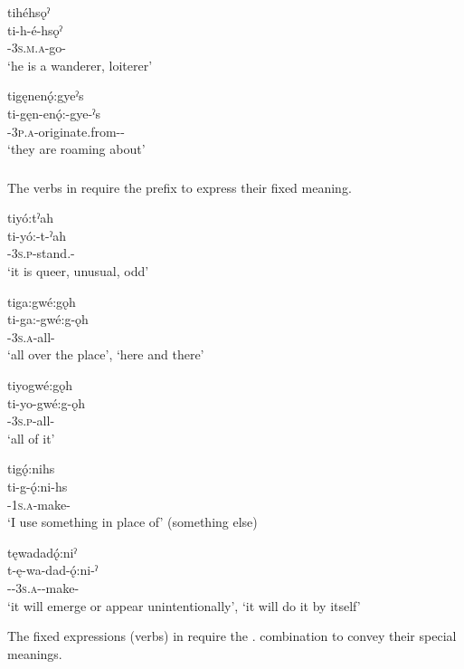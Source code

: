 \ex tihéhsǫˀ\\
\gll ti-h-é-hsǫˀ\\
{\contrastive}-\textsc{3s.m.a}-go-{\pluralizer}\\
\glt `he is a wanderer, loiterer'

\ex tigęnenǫ́:gyeˀs\\
\gll ti-gęn-enǫ́:-gye-ˀs\\
{\contrastive}-\textsc{3p.a}-originate.from-\exsc{\progressive}-{\habitual}\\
\glt `they are roaming about'
\z
\z


\subsubsection*{} \label{[ti-verb]}
The verbs in  require the  {\contrastive} prefix to express their fixed meaning.

\ea\label{ex:tireq}

\ea tiyó:tˀah\\
\gll ti-yó:-t-ˀah\\
{\contrastive}-\textsc{3s.p}-stand.{\stative}-{\diminutive}\\
\glt `it is queer, unusual, odd'

\ex tiga:gwé:gǫh \\
\gll ti-ga:-gwé:g-ǫh\\
{\contrastive}-\textsc{3s.a}-all-{\stative}\\
\glt ‘all over the place’, `here and there'

\ex tiyogwé:gǫh\\
\gll ti-yo-gwé:g-ǫh\\
{\contrastive}-\textsc{3s.p}-all-{\stative}\\
\glt `all of it'

\ex tigǫ́:nihs\\
\gll ti-g-ǫ́:ni-hs\\
{\contrastive}-\textsc{1s.a}-make-{\habitual}\\
\glt `I use something in place of' (something else)

\ex tęwadadǫ́:niˀ\\
\gll t-ę-wa-dad-ǫ́:ni-ˀ\\
{\contrastive}-{\future}-\textsc{3s.a}-{}-make-{\punctual}\\
\glt  ‘it will emerge or appear unintentionally’, `it will do it by itself'
\z
\z

The fixed expressions (verbs) in  require the  \textsc{\contrastive.\dualic} combination to convey their special meanings. 

